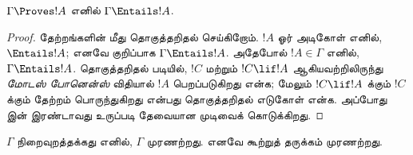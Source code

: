 \documentclass[../../../include/open-logic-section]{subfiles}
\begin{document}


\begin{thm}[சரித்தன்மை]
$\Gamma\Proves!A$ எனில் $\Gamma \Entails !A$.
\end{thm}

\begin{proof}
தேற்றங்களின் மீது தொகுத்தறிதல் செய்கிறோம். $!A$ ஓர் அடிகோள் எனில்,
$\Entails !A$; எனவே குறிப்பாக $\Gamma \Entails!A$.
அதேபோல் $!A \in \Gamma$ எனில், $\Gamma \Entails!A$.
தொகுத்தறிதல் படியில், $!C$ மற்றும் $!C\lif!A$ ஆகியவற்றிலிருந்து
\emph{மோடஸ் போனென்ஸ்} விதியால் $!A$ பெறப்படுகிறது என்க;
மேலும் $!C\lif !A$ க்கும் $!C$ க்கும் தேற்றம் பொருந்துகிறது என்பது
தொகுத்தறிதல் எடுகோள் என்க. அப்போது
 இன் இரண்டாவது உருப்படி
தேவையான முடிவைக் கொடுக்கிறது.
\end{proof}

\begin{cor}
$\Gamma$ நிறைவுறத்தக்கது எனில், $\Gamma$ முரணற்றது.
எனவே கூற்றுத் தருக்கம் முரணற்றது.
\end{cor}
\end{document}
